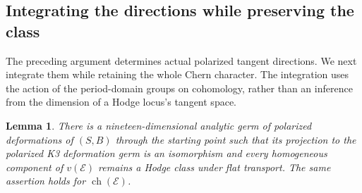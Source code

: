 \documentclass[11pt]{article}
\numberwithin{equation}{section}
\newtheorem{lemma}[theorem]{Lemma}
\theoremstyle{definition}
\theoremstyle{remark}
\newcommand{\ch}{\operatorname{ch}}
\begin{document}
\subsection{Integrating the directions while preserving the class}

The preceding argument determines actual polarized tangent directions.
We next integrate them while retaining the whole Chern character.
The integration uses the action of the period-domain groups on
cohomology, rather than an inference from the dimension of a Hodge
locus's tangent space.

\begin{lemma}\label{lem:Hodge-germ}
There is a nineteen-dimensional analytic germ of polarized deformations
of $(S,B)$ through the starting point such that its projection to the
polarized K3 deformation germ is an isomorphism and every homogeneous
component of $v(\mathcal E)$ remains a Hodge class under flat transport.
The same assertion holds for $\ch(\mathcal E)$.
\end{lemma}
\end{document}
